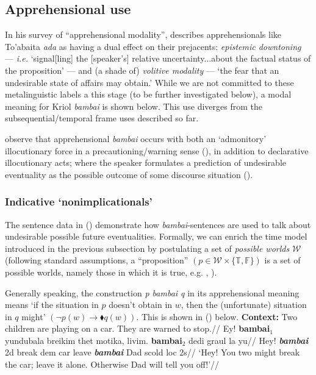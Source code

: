 \documentclass[11pt]{article}
\begin{document}
	\subsection{Apprehensional use}\label{dataSapp}



In his survey of ``apprehensional modality'', \citet[295-6]{Lichtenberk1995} describes apprehensionals like To'abaita \textit{ada} as having a dual effect on their prejacents: \textit{epistemic downtoning} --- \textit{i.e.} `signal[ling] the [speaker's] relative uncertainty...about the factual status of the proposition' --- and (a shade of) \textit{volitive modality} --- `the fear that an undesirable state of affairs may obtain.' While we are not committed to these metalinguistic labels a this stage (to be further investigated below), a modal meaning for Kriol \textit{bambai} is shown below. This use diverges from the subsequential/temporal frame uses described so far.


\citet[272\textit{ff}]{Angelo2016} observe that apprehensional \textit{bambai} occurs with both an `admonitory' illocutionary force in a precautioning/warning sense (), in addition to declarative illocutionary acts; where the speaker formulates a prediction of undesirable eventuality as the possible outcome of some discourse situation (). 


\subsubsection{Indicative `nonimplicationals'}
The sentence data in () demonstrate how \textit{bambai}-sentences are used to talk about undesirable possible future eventualities. Formally, we can enrich the time model introduced in the previous subsection by postulating a set of \textit{possible worlds} $\mathcal W$ (following standard assumptions, a ``proposition'' $(p\in\mathcal W\times\{\mathbb{T,F}\})$ is a set of possible worlds, namely those in which it is true, e.g. \citealp{Stalnaker1979}, \citealp{Kripke1963}). 

Generally speaking, the construction \textit{p bambai q} in its apprehensional meaning means `if the situation in $p$ doesn't obtain in $w$, then the (unfortunate) situation in $q$ might' $(\neg p(w)\to\blacklozenge q(w))$. This is shown in () below.	
\pex
\a{}\begingl
\glpreamble \textbf{Context:} Two children are playing on a car. They are warned to stop.//
\gla Ey! \textbf{bambai$_1$} yundubala breikim thet motika, livim. \textbf{bambai$_2$} dedi graul la yu//
\glb Hey! \textbf{\textit{bambai}} 2d break {\sc dem} car leave \textbf{\textit{bambai}} Dad scold {\sc loc} 2s//
\glft `Hey! You two might break the car; leave it alone. Otherwise Dad will tell you off!'\trailingcitation[A\&SB: 273]//
\endgl
\end{document}
